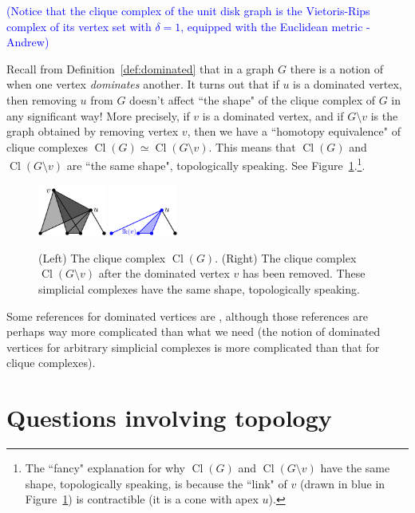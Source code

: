 \documentclass[amscd, amssymb, verbatim]{amsart}[12pt]
\newcommand{\note}[1]{\textcolor{blue}{({#1})}}
\theoremstyle{plain}
\theoremstyle{definition}
\DeclareMathOperator{\cl}{Cl}
\begin{document}
\note{Notice that the clique complex of the unit disk graph is the Vietoris-Rips complex of its vertex set with $\delta = 1$, equipped with the Euclidean metric - Andrew}

Recall from Definition~\ref{def:dominated} that in a graph $G$ there is a notion of when one vertex \emph{dominates} another.
It turns out that if $u$ is a dominated vertex, then removing $u$ from $G$ doesn't affect ``the shape" of the clique complex of $G$ in any significant way!
More precisely, if $v$ is a dominated vertex, and if $G\setminus v$ is the graph obtained by removing vertex $v$, then we have a ``homotopy equivalence" of clique complexes $\cl(G)\simeq \cl(G\setminus v)$.
This means that $\cl(G)$ and $\cl(G\setminus v)$ are ``the same shape", topologically speaking.
See Figure~\ref{fig:dominatedClique}.\footnote{The ``fancy" explanation for why $\cl(G)$ and $\cl(G\setminus v)$ have the same shape, topologically speaking, is because the ``link" of $v$ (drawn in blue in Figure~\ref{fig:dominatedClique}) is contractible (it is a cone with apex $u$).}.

\begin{figure}[h]
\centering
\includegraphics[width=0.2\textwidth]{Dominated2_labeled.pdf}
\hspace{20mm}
\includegraphics[width=0.2\textwidth]{Dominated4_labeled.pdf}
\caption{(Left) The clique complex $\cl(G)$. (Right) The clique complex $\cl(G\setminus v)$ after the dominated vertex $v$ has been removed. These simplicial complexes have the same shape, topologically speaking.}
\label{fig:dominatedClique}
\end{figure}

Some references for dominated vertices are \cite{BabsonKozlov2006,barmak2012strong,Matouvsek2008}, although those references are perhaps way more complicated than what we need (the notion of dominated vertices for arbitrary simplicial complexes is more complicated than that for clique complexes).


\section{Questions involving topology}
\end{document}
